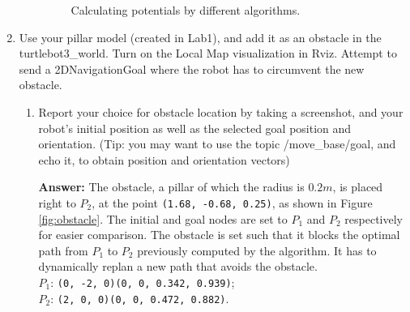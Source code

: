 \documentclass[12pt]{article}
\begin{document}
\begin{enumerate}
\begin{enumerate}
        \begin{figure}[h!]
            \centering
            \hspace{3ex}
            \caption{Calculating potentials by different algorithms.}
            \label{fig:potentials}
        \end{figure}

    \end{enumerate}
    
    \item Use your pillar model (created in Lab1), and add it as an obstacle in the turtlebot3\_world. Turn on the Local Map visualization in Rviz. Attempt to send a 2DNavigationGoal where the robot has to circumvent the new obstacle.
    \begin{enumerate}
        \item Report your choice for obstacle location by taking a screenshot, and your robot’s initial position as well as the selected goal position and orientation. (Tip: you may want to use the topic /move\_base/goal, and echo it, to obtain position and orientation vectors)
        
        \textbf{Answer: }The obstacle, a pillar of which the radius is $0.2m$, is placed right to $P_2$, at the point \texttt{(1.68, -0.68, 0.25)}, as shown in Figure \ref{fig:obstacle}. The initial and goal nodes are set to $P_1$ and $P_2$ respectively for easier comparison. The obstacle is set such that it blocks the optimal path from $P_1$ to $P_2$ previously computed by the algorithm. It has to dynamically replan a new path that avoids the obstacle.
        \\$P_1$: \texttt{(0, -2, 0)(0, 0, 0.342, 0.939)};\\$P_2$: \texttt{(2, 0, 0)(0, 0, 0.472, 0.882)}.
        

\end{enumerate}
\end{enumerate}
\end{document}
